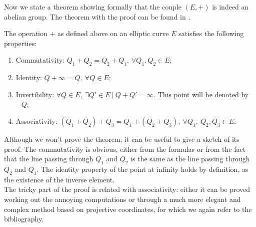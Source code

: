 \bigskip
\noindent
Now we state a theorem showing formally that the couple $(E, +)$ is indeed an abelian group. The theorem with the proof can be found in \cite{RefWork:1}.
\begin{thm} The operation $+$ as defined above on an elliptic curve $E$ satisfies the following properties:
	\begin{enumerate}
		\item Commutativity: $Q_1 + Q_2 = Q_2 + Q_1, \ \forall Q_1, Q_2 \in E$;
		\item Identity: $Q + \infty = Q, \ \forall Q \in E$;
		\item Invertibility: $\forall Q \in E, \ \exists Q' \in E \ | \ Q + Q' = \infty$. This point will be denoted by $-Q$;
		\item Associativity: $(Q_1 + Q_2) + Q_3 = Q_1 + (Q_2 + Q_3), \ \forall Q_1, \ Q_2, Q_3 \in E$.
	\end{enumerate}
\end{thm}

\bigskip
\noindent
Although we won't prove the theorem, it can be useful to give a sketch of its proof. The commutativity is obvious, either from the formulas or from the fact that the line passing through $Q_1$ and $Q_2$ is the same as the line passing through $Q_2$ and $Q_1$. The identity property of the point at infinity holds by definition, as the existence of the inverse element.
\\
The tricky part of the proof is related with associativity: either it can be proved working out the annoying computations or through a much more elegant and complex method based on projective coordinates, for which we again refer to the bibliography.

